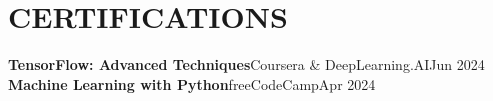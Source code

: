 \documentclass[letterpaper,11pt]{article}
\begin{document}
\section{\faCertificate\hspace{5pt}CERTIFICATIONS}
 \begin{itemize}[leftmargin=0in, label={}]
    \small{\item{
      \textcolor{accent}{\faCheckCircle}\hspace{5pt}\textbf{TensorFlow: Advanced Techniques}\hspace{4pt}{\color{dark-grey}---}\hspace{4pt}Coursera \& DeepLearning.AI\hfill{\color{dark-grey}Jun 2024}\\[5pt]
      \textcolor{accent}{\faCheckCircle}\hspace{5pt}\textbf{Machine Learning with Python}\hspace{4pt}{\color{dark-grey}---}\hspace{4pt}freeCodeCamp\hfill{\color{dark-grey}Apr 2024}
    }}
 \end{itemize}


\end{document}
